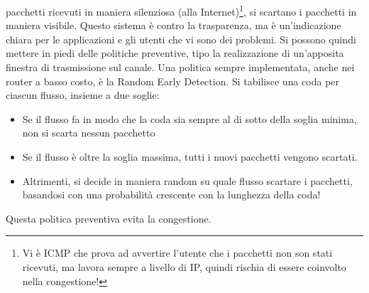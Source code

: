 pacchetti ricevuti in maniera silenziosa
(alla Internet)\footnote{Vi è ICMP che prova ad avvertire l’utente che i
pacchetti non son stati ricevuti, ma lavora
sempre a livello di IP, quindi rischia di essere coinvolto nella congestione!},
si scartano i pacchetti in maniera
visibile. Questo sistema è contro la trasparenza, ma è un'indicazione chiara per
le applicazioni e gli utenti che vi
sono dei problemi. Si possono quindi mettere in piedi delle politiche
preventive, tipo la realizzazione di un'apposita
finestra di trasmissione sul canale.
Una politica sempre implementata, anche nei router a basso costo, è la Random
Early Detection. Si tabilisce una coda
per ciascun flusso, insieme a due soglie:
\begin{itemize}
 \item Se il flusso fa in modo che la coda sia sempre al di sotto della soglia
minima, non si scarta nessun pacchetto
 \item Se il flusso è oltre la soglia massima, tutti i nuovi pacchetti vengono
scartati.
 \item Altrimenti, si decide in maniera random su quale flusso scartare i
pacchetti, basandosi con una probabilità
 crescente con la lunghezza della coda!
\end{itemize}
Questa politica preventiva evita la congestione.
